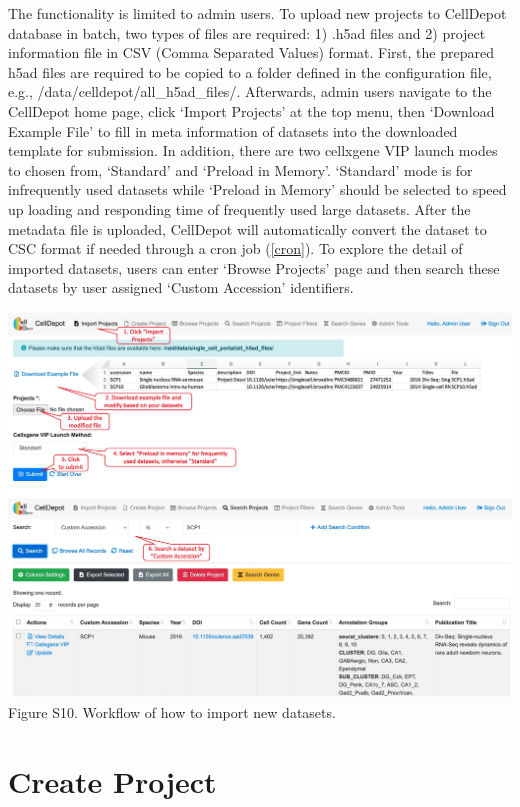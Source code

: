 \documentclass[
  openany]{book}
\begin{document}
The functionality is limited to admin users. To upload new projects to CellDepot database in batch, two types of files are required: 1) .h5ad files and 2) project information file in CSV (Comma Separated Values) format. First, the prepared h5ad files are required to be copied to a folder defined in the configuration file, e.g., /data/celldepot/all\_h5ad\_files/. Afterwards, admin users navigate to the CellDepot home page, click `Import Projects' at the top menu, then `Download Example File' to fill in meta information of datasets into the downloaded template for submission. In addition, there are two cellxgene VIP launch modes to chosen from, `Standard' and `Preload in Memory'. `Standard' mode is for infrequently used datasets while `Preload in Memory' should be selected to speed up loading and responding time of frequently used large datasets.
After the metadata file is uploaded, CellDepot will automatically convert the dataset to CSC format if needed through a cron job (\ref{cron}). To explore the detail of imported datasets, users can enter `Browse Projects' page and then search these datasets by user assigned `Custom Accession' identifiers.

\href{https://interactivereport.github.io/CellDepot/bookdown/figures/S10.jpg}{\includegraphics{figures/S10.jpg}}
Figure S10. Workflow of how to import new datasets.

\hypertarget{create-project}{%
\section{Create Project}\label{create-project}}
\end{document}

